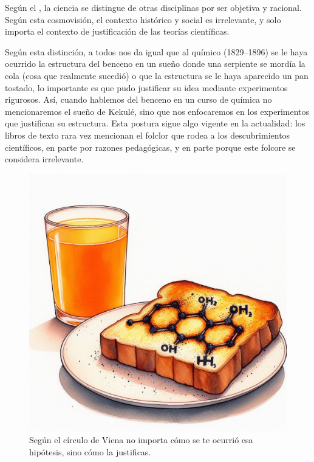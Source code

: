 \begin{remember}
    \label{rem:circulodeviena}
    Según el , la ciencia se distingue de otras
    disciplinas por ser objetiva y racional.
    Según esta cosmovisión, el contexto histórico y social es irrelevante, y
    solo importa el contexto de justificación de las teorías científicas.
\end{remember}

Según esta distinción, a todos nos da igual que al químico  (1829--1896) se le haya ocurrido la
estructura del benceno en un sueño donde una serpiente se mordía la cola (cosa
que realmente sucedió) o que la estructura se le haya aparecido un pan tostado,
lo importante es que pudo justificar su idea mediante experimentos rigurosos.
Así, cuando hablemos del benceno en un curso de química no mencionaremos el
sueño de Kekulé, sino que nos enfocaremos en los experimentos que justifican
su estructura.
Esta postura sigue algo vigente en la actualidad: los libros de texto rara vez
mencionan el folclor que rodea a los descubrimientos científicos, en parte por
razones pedagógicas, y en parte porque este folcore se considera irrelevante.

\begin{figure}[ht]
    \centering
    \includegraphics[width=0.8\linewidth]{img/formaciondehipotesis}
    \caption{Según el círculo de Viena no importa cómo se te ocurrió esa
        hipótesis, sino cómo la justificas.}
\end{figure}

